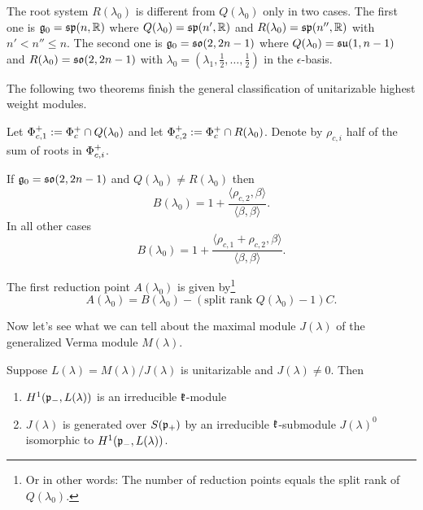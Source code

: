 The root system $R(\lambda_0)$ is different from $Q(\lambda_0)$ only in two cases. The first one is $\mathfrak{g}_0=\mathfrak{sp}(n,\mathbb{R})$ where $Q(\lambda_0) = \mathfrak{sp}(n',\mathbb{R})$ and $R(\lambda_0) = \mathfrak{sp}(n'',\mathbb{R})$ with $n' < n'' \leq n$. The second one is $\mathfrak{g}_0=\mathfrak{so}(2,2n-1)$ where $Q(\lambda_0) = \mathfrak{su}(1,n-1)$ and $R(\lambda_0) = \mathfrak{so}(2,2n-1)$ with $\lambda_0 = (\lambda_1,\frac{1}{2},\ldots,\frac{1}{2})$ in the $\epsilon$-basis.

The following two theorems finish the general classification of unitarizable highest weight modules.

\begin{theorem}
 Let $\Phi^+_{c,1} := \Phi^+_c \cap Q(\lambda_0)$ and let $\Phi^+_{c,2} := \Phi^+_c \cap R(\lambda_0)$. Denote by $\rho_{c,i}$ half of the sum of roots in $\Phi^+_{c,i}$.
 
 If $\mathfrak{g}_0=\mathfrak{so}(2,2n-1)$ and $Q(\lambda_0) \neq R(\lambda_0)$ then \[B(\lambda_0) = 1 + \frac{\langle \rho_{c,2},\beta\rangle}{\langle \beta, \beta \rangle}.\]
 In all other cases \[B(\lambda_0) = 1 + \frac{ \langle \rho_{c,1} + \rho_{c,2} , \beta \rangle}{\langle \beta, \beta \rangle}.\]
\end{theorem}


\begin{theorem}\label{thm:reduction_points}
 The first reduction point $A(\lambda_0)$ is given by\footnote{Or in other words: The number of reduction points equals the split rank of $Q(\lambda_0)$.}
 \[
   A(\lambda_0) = B(\lambda_0) - (\text{split rank } Q(\lambda_0) -1) C.
 \]
\end{theorem}

Now let's see what we can tell about the maximal module $J(\lambda)$ of the generalized Verma module $M(\lambda)$. %

\begin{theorem}
 Suppose $L(\lambda) = M(\lambda)/J(\lambda)$ is unitarizable and $J(\lambda)\neq 0$. Then
 \begin{enumerate}
  \item $H^1(\mathfrak{p}_-,L(\lambda))$ is an irreducible $\mathfrak{k}$-module
  \item $J(\lambda)$ is generated over $S(\mathfrak{p}_+)$ by an irreducible $\mathfrak{k}$-submodule $J(\lambda)^0$ isomorphic to $H^1(\mathfrak{p}_-,L(\lambda))$.
 \end{enumerate}
\end{theorem}



